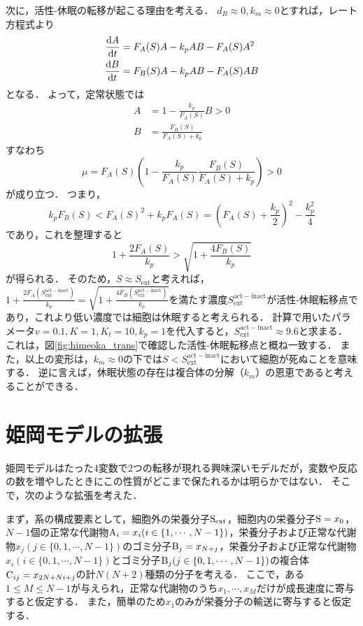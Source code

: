 \documentclass[a4paper,11pt]{jsarticle}
\begin{document}
次に，活性-休眠の転移が起こる理由を考える．
$d_B\approx 0, k_m\approx 0$とすれば，レート方程式より
\begin{align}
  \dv{A}{t} &= F_A(S)A - k_p AB - F_A(S)A^2 \\
  \dv{B}{t} &= F_B(S)A - k_p AB - F_A(S)AB
\end{align}
となる．
よって，定常状態では
\begin{align}
  A &= 1 - \frac{k_p}{F_A(S)}B >0 \\
  B &= \frac{F_B(S)}{F_A(S)+k_p}
\end{align}
すなわち
\begin{equation}
  \mu = F_A(S)\left(1-\frac{k_p}{F_A(S)}\frac{F_B(S)}{F_A(S)+k_p}\right) >0
\end{equation}
が成り立つ．
つまり，
\begin{equation}
  k_p F_B(S) < F_A(S)^2 + k_p F_A(S) = \left(F_A(S) + \frac{k_p}{2}\right)^2 - \frac{k_p^2}{4}
\end{equation}
であり，これを整理すると
\begin{equation}
  1+\frac{2F_A(S)}{k_p} > \sqrt{1+\frac{4F_B(S)}{k_p}}
\end{equation}
が得られる．
そのため，$S\approx S_{\mathrm{ext}}$と考えれば，$1+\frac{2F_A(S^{\mathrm{act-inact}}_{\mathrm{ext}})}{k_p} = \sqrt{1+\frac{4F_B(S^{\mathrm{act-inact}}_{\mathrm{ext}})}{k_p}}$を満たす濃度$S^{\mathrm{act-inact}}_{\mathrm{ext}}$が活性-休眠転移点であり，これより低い濃度では細胞は休眠すると考えられる．
計算で用いたパラメータ$v=0.1, K=1, K_t=10, k_p=1$を代入すると，$S^{\mathrm{act-inact}}_{\mathrm{ext}}\approx 9.6$と求まる．
これは，図\ref{fig:himeoka_trans}で確認した活性-休眠転移点と概ね一致する．
また，以上の変形は，$k_m\approx 0$の下では$S<S^{\mathrm{act-inact}}_{\mathrm{ext}}$において細胞が死ぬことを意味する．
逆に言えば，休眠状態の存在は複合体の分解（$k_m$）の恩恵であると考えることができる．


\section{姫岡モデルの拡張}
姫岡モデルはたった4変数で2つの転移が現れる興味深いモデルだが，変数や反応の数を増やしたときにこの性質がどこまで保たれるかは明らかではない．
そこで，次のような拡張を考えた．

まず，系の構成要素として，細胞外の栄養分子$\ce{S_{ext}}$，細胞内の栄養分子$\ce{S}=x_0$，$N-1$個の正常な代謝物$\ce{A_i}=x_i(i\in\{1,\cdots,N-1\})$，栄養分子および正常な代謝物$x_j(j\in\{0,1,\cdots,N-1\})$のゴミ分子$\ce{B_j}=x_{N+j}$，栄養分子および正常な代謝物$x_i(i\in\{0,1,\cdots,N-1\})$とゴミ分子$\ce{B_{j}}(j\in\{0,1,\cdots,N-1\})$の複合体$\ce{C_{i j}}=x_{2N+Ni+j}$の計$N(N+2)$種類の分子を考える．
ここで，ある$1\le M \le N-1$が与えられ，正常な代謝物のうち$x_1,\cdots,x_M$だけが成長速度に寄与すると仮定する．
また，簡単のため$x_1$のみが栄養分子の輸送に寄与すると仮定する．
\end{document}
